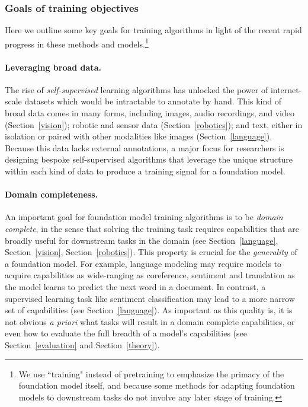 \subsubsection{Goals of training objectives} 

Here we outline some key goals for training algorithms in light of the recent rapid progress in these methods and models.\footnote{We use ``training" instead of pretraining to emphasize the primacy of the foundation model itself, and because some methods for adapting foundation models to downstream tasks do not involve any later stage of training.}

\paragraph{Leveraging broad data.} The rise of \textit{self-supervised} learning algorithms has unlocked the power of internet-scale datasets which would be intractable to annotate by hand. This kind of broad data comes in many forms, including images, audio recordings, and video (Section~\ref{vision}); robotic and sensor data (Section~\ref{robotics}); and text, either in isolation or paired with other modalities like images (Section~\ref{language}). Because this data lacks external annotations, a major focus for researchers is designing bespoke self-supervised algorithms that leverage the unique structure within each kind of data to produce a training signal for a foundation model.

\paragraph{Domain completeness.} An important goal for foundation model training algorithms is to be \textit{domain complete}, in the sense that solving the training task requires capabilities that are broadly useful for downstream tasks in the domain (see Section~\ref{language}, Section~\ref{vision}, Section~\ref{robotics}). This property is crucial for the \textit{generality} of a foundation model. For example, language modeling may require models to acquire capabilities as wide-ranging as coreference, sentiment and translation as the model learns to predict the next word in a document. In contrast, a supervised learning task like sentiment classification may lead to a more narrow set of capabilities (see Section~\ref{language}). As important as this quality is, it is not obvious \textit{a priori} what tasks will result in a domain complete capabilities, or even how to evaluate the full breadth of a model's capabilities (see Section~\ref{evaluation} and Section~\ref{theory}). 

